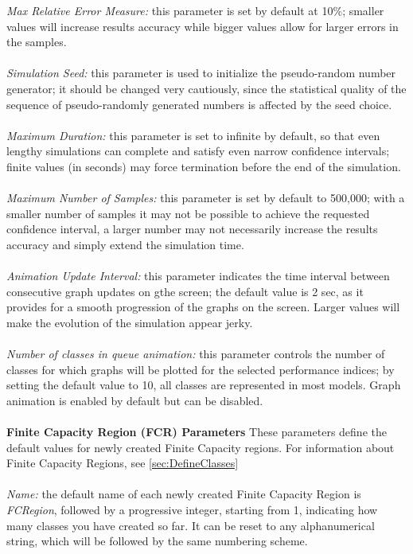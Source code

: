 \begin{description*}
\emph{Max Relative Error Measure:}
this parameter is set by default at 10\%; smaller values will increase results accuracy while bigger values allow for larger errors in the samples.\\\\
\emph{Simulation Seed:}
this parameter is used to initialize the pseudo-random number generator; it should be changed very cautiously, since the statistical quality of the sequence of pseudo-randomly generated numbers is affected by the seed choice.\\\\
\emph{Maximum Duration:}
this parameter is set to infinite by default, so that even lengthy simulations can complete and satisfy even narrow confidence intervals; finite values (in seconds) may force termination before the end of the simulation.\\\\
\emph{Maximum Number of Samples: }
this parameter is set by default to 500,000; with a smaller number of samples it may not be possible to achieve the requested confidence interval, a larger number may not necessarily increase the results accuracy and simply extend the simulation time.\\\\
\emph{Animation Update Interval:}
this parameter indicates the time interval between consecutive graph updates on gthe screen; the default value is 2 sec, as it provides for a smooth progression of the graphs on the screen. Larger values will make the evolution of the simulation appear jerky.\\\\
\emph{Number of classes in queue animation: }
this parameter controls the number of classes for which graphs will be plotted for the selected performance indices; by setting the default value to 10, all classes are represented in most models. Graph animation is enabled by default but can be disabled.\\\\
\textbf{Finite Capacity Region (FCR) Parameters}
These parameters define the default values for newly created Finite Capacity regions. For information about Finite Capacity Regions, see \autoref{sec:DefineClasses}\\\\
\emph{Name:}
the default name of each newly created Finite Capacity Region is \emph{FCRegion}, followed by a progressive integer, starting from 1, indicating how many classes you have created so far. It can be reset to any alphanumerical string, which will be followed by the same numbering scheme.\\\\

\end{description*}
